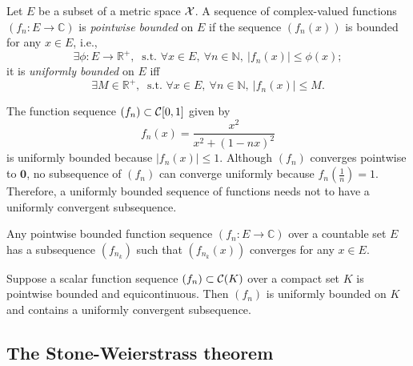 \begin{defn}
  \label{def:uniformlyBounded}
  Let $E$ be a subset of a metric space ${\cal X}$.
  A sequence of complex-valued functions $(f_n: E\rightarrow\mathbb{C})$  
  is \emph{pointwise bounded} on $E$
  if the sequence $(f_n(x))$ is bounded for any $x\in E$, i.e.,
  \begin{equation}
    \label{eq:pointwiseBounded}
    \exists \phi:E\rightarrow\mathbb{R}^+,\ \text{ s.t. } \forall x\in E,\
    \forall n\in\mathbb{N},\ |f_n(x)|\le \phi(x);
  \end{equation}
  it is \emph{uniformly bounded} on $E$ iff
  \begin{equation}
    \label{eq:uniformlyBounded}
    \exists M\in \mathbb{R}^+,\ \text{ s.t. } \forall x\in E,\
    \forall n\in\mathbb{N},\ |f_n(x)|\le M.
  \end{equation}
\end{defn}

\begin{exm}
  \label{exm:uniformBoundednessNoConvSubsequence}
  The function sequence $(f_n)\subset {\cal C}[0,1]$ given by
  \begin{equation}
    \label{eq:FnotEquicontinuous}
    f_n(x)=\frac{x^2}{x^2+(1-nx)^2}
  \end{equation}
  is uniformly bounded because $|f_n(x)|\le 1$.
  Although $(f_n)$ converges pointwise to $\mathbf{0}$,
   no subsequence of $(f_n)$ can converge uniformly
   because $f_n(\frac{1}{n})=1$.
  Therefore, a uniformly bounded sequence of functions
   needs not to have a uniformly convergent subsequence.
\end{exm}

\begin{lem}
  \label{lem:pointwiseBoundedOnCountableSet}
  Any pointwise bounded function sequence $(f_n: E\rightarrow \mathbb{C})$
  over a countable set $E$ 
  has a subsequence $(f_{n_k})$
  such that $(f_{n_k}(x))$ converges for any $x\in E$. 
\end{lem}

\begin{thm}%
  \label{thm:AscoliSequence}
  Suppose a scalar function sequence $(f_n)\subset {\cal C}(K)$
  over a compact set $K$ is pointwise bounded and equicontinuous.
  Then $(f_n)$ is uniformly bounded on $K$
  and contains a uniformly convergent subsequence.
\end{thm}

\subsection{The Stone-Weierstrass theorem}


